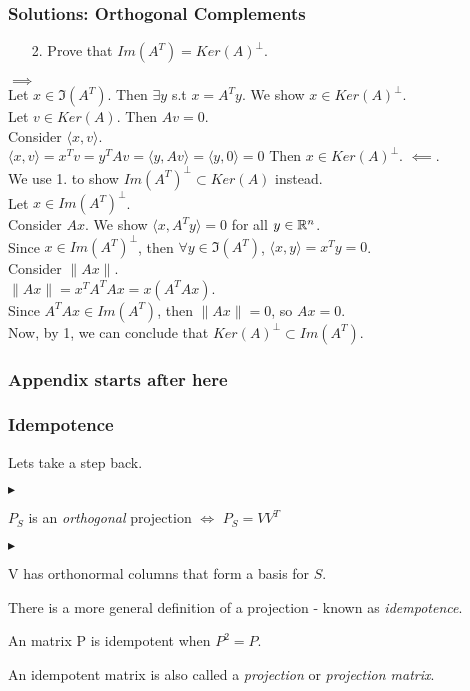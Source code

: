 \documentclass{beamer}
\renewenvironment{itemize}
\renewenvironment{enumerate}%
{\begin{list}{\arabic{enumi}.}%
      {\setlength{\leftmargin}{2.5em}%
       \setlength{\itemsep}{-\parsep}%
       \setlength{\topsep}{-\parskip}%
       \usecounter{enumi}}%
 }{\end{list}}
\renewenvironment{itemize}%
{\begin{list}{$\blacktriangleright$}%
      {\setlength{\leftmargin}{2.5em}%
       \setlength{\itemsep}{-\parsep}%
       \setlength{\topsep}{-\parskip}%
       \usecounter{enumi}}%
 }{\end{list}}
\begin{document}
\begin{frame}
\frametitle{Solutions: Orthogonal Complements}
\begin{enumerate}
\item[2.] Prove that $Im(A^T) = Ker(A)^\perp$.
\end{enumerate}
\begin{solution}
$\implies$ \\
Let $x\in \Im(A^T)$. Then $\exists y$ s.t $x = A^Ty$. We show $x\in Ker(A)^\perp$.\\
Let $v\in Ker(A)$. Then $Av=0$. \\
Consider $\langle x,v \rangle$. \\
\qquad $\langle x,v \rangle = x^Tv = y^TAv =\langle y,Av \rangle =\langle y,0 \rangle = 0$
Then $x\in Ker(A)^\perp$.
$\impliedby$.\\
We use 1. to show $Im(A^T)^\perp \subset Ker(A)$ instead.\\
Let $x\in Im(A^T)^\perp$. \\
Consider $Ax$. We show $\langle x,A^Ty \rangle = 0$ for all $y\in \mathbb{R}^n$. \\
Since $x\in Im(A^T)^\perp$, then $\forall y\in \Im(A^T)$, $\langle x,y \rangle = x^Ty = 0$.\\
Consider $\|Ax\|$.\\ 
\qquad $\|Ax\| = x^TA^TAx = x(A^TAx)$.\\
Since $A^TAx \in Im(A^T)$, then $\|Ax\| = 0$, so $Ax=0$.\\ 
Now, by 1, we can conclude that $Ker(A)^\perp \subset Im(A^T)$.

\end{solution}
\end{frame}

\begin{frame}
\frametitle{Appendix starts after here}

\end{frame}
\begin{frame}
\frametitle{Idempotence}
Lets take a step back.\medskip
\begin{itemize}
\item $P_S$ is an \textit{orthogonal} projection $\iff$ $P_S = VV^T$
\begin{itemize}
 \item V has orthonormal columns that form a basis for $S$.\\
\end{itemize}
\item There is a more general definition of a projection - known as \textit{idempotence}.

\begin{definition}[Idempotence]
An matrix P is idempotent when $P^2=P$.
\end{definition}
\end{itemize}
An idempotent matrix is also called a \textit{projection} or \textit{projection matrix}.
\end{frame}
\end{document}
